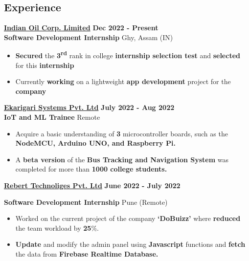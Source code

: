 \documentclass[]{article}
\newenvironment{tightemize}{
\vspace{-\topsep}\begin{itemize}\itemsep1pt \parskip1pt \parsep0pt}
{\end{itemize}\vspace{-\topsep}}
\newcommand{\company}[2]{
  {\Large{{#1}}
  \hfill \footnotesize{#2}}
}
\newcommand{\role}[2]{
  {\large {{#1}}
    \hfill \small{#2}
  }
}
\begin{document}
\begin{multicols}{2}
\begin{flushleft}
    \section*{Experience}
    \company{\textbf{\href{https://iocl.com/}{Indian Oil Corp. Limited}}}{\textbf{Dec 2022 - Present}} \\
    \role{\textbf{Software Development Internship}}{Ghy, Assam (IN)}
    \begin{tightemize}
      \item {\textbf{Secured} the  \textbf{3\textsuperscript{rd}} rank in  college \textbf{internship selection test} and  \textbf{selected} for this \textbf{internship}}
      \item {Currently \textbf{working} on a lightweight \textbf{app development} project for the \textbf{company}} 
    \end{tightemize}


    \company{\textbf{\href{https://ekarigari.in/}{Ekarigari Systems Pvt. Ltd}}}{\textbf{July 2022 - Aug 2022}} \\
    \role{{\textbf{IoT and ML Trainee}}}{Remote }
    \begin{tightemize}
      \item  Acquire a basic understanding of \textbf{3} microcontroller
            boards, such as the \textbf{NodeMCU, Arduino UNO, and Raspberry
            Pi.}
      \item A \textbf{beta version} of the \textbf{Bus Tracking and Navigation
            System} was completed for more than \textbf{1000 college
            students.}
    \end{tightemize}

    \company{\textbf{\href{https://www.linkedin.com/company/rebert-tech/about/}{Rebert Technoliges Pvt. Ltd}}}{\textbf{June 2022 - July 2022}}
    \role{{\textbf{Software Development Internship}}}{Pune (Remote)}
    \begin{tightemize}
      \item  Worked on the current project of the company
            \textbf{‘DoBuizz’} where  \textbf{reduced} the team workload by \textbf{25}\%.
      \item \textbf{Update} and modify the 
      admin panel using \textbf{Javascript}
            functions and \textbf{fetch} the data from \textbf{Firebase Realtime
            Database.}
    \end{tightemize}


\end{flushleft}
\end{multicols}
\end{document}
